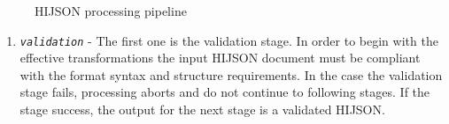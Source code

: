 \begin{figure}[!htbp]
\centering
{}
\caption{HIJSON processing pipeline}
\label{fig:pipeline}
\end{figure}

\begin{enumerate}
\def\labelenumi{\arabic{enumi}.}
\itemsep1pt\parskip0pt
\item
 \textit{\texttt{validation}} - The first one is the validation stage. In
  order to begin with the effective transformations the input HIJSON  document
  must be compliant with the format syntax and structure requirements.   In the
  case the validation stage fails, processing aborts and do not continue to
  following stages. If  the stage success, the output for the next stage is a
  validated  HIJSON.


\end{enumerate}
